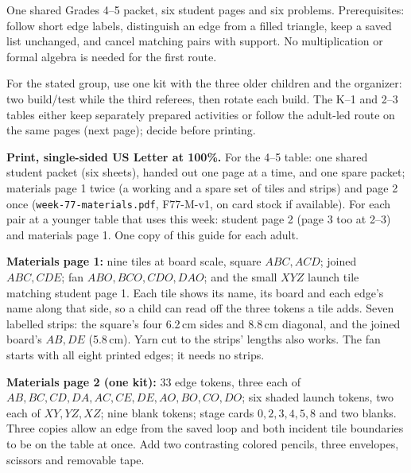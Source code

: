 \documentclass[10pt,letterpaper]{article}
\newcommand{\sectiontitle}[1]{\par\vspace{5pt}{\bfseries\fontsize{12}{14}\selectfont #1}\par\nopagebreak}
\begin{document}
\sectiontitle{Who uses this prototype}
One shared Grades 4--5 packet, six student pages and six problems. Prerequisites: follow short edge labels, distinguish an edge from a filled triangle, keep a saved list unchanged, and cancel matching pairs with support. No multiplication or formal algebra is needed for the first route.

For the stated group, use one kit with the three older children and the organizer: two build/test while the third referees, then rotate each build. The K--1 and 2--3 tables either keep separately prepared activities or follow the adult-led route on the same pages (next page); decide before printing.

\sectiontitle{Print and prepare}
\textbf{Print, single-sided US Letter at 100\%.} For the 4--5 table: one shared student packet (six sheets), handed out one page at a time, and one spare packet; materials page 1 twice (a working and a spare set of tiles and strips) and page 2 once (\texttt{week-77-materials.pdf}, F77-M-v1, on card stock if available). For each pair at a younger table that uses this week: student page 2 (page 3 too at 2--3) and materials page 1. One copy of this guide for each adult.

\textbf{Materials page 1:} nine tiles at board scale, square \(ABC,ACD\); joined \(ABC,CDE\); fan \(ABO,BCO,CDO,DAO\); and the small \(XYZ\) launch tile matching student page 1. Each tile shows its name, its board and each edge's name along that side, so a child can read off the three tokens a tile adds. Seven labelled strips: the square's four 6.2\,cm sides and 8.8\,cm diagonal, and the joined board's \(AB,DE\) (5.8\,cm). Yarn cut to the strips' lengths also works. The fan starts with all eight printed edges; it needs no strips.

\textbf{Materials page 2 (one kit):} 33 edge tokens, three each of \(AB,BC,CD,DA,AC,CE,DE,AO,BO,CO,DO\); six shaded launch tokens, two each of \(XY,YZ,XZ\); nine blank tokens; stage cards \(0,2,3,4,5,8\) and two blanks. Three copies allow an edge from the saved loop and both incident tile boundaries to be on the table at once. Add two contrasting colored pencils, three envelopes, scissors and removable tape.
\end{document}
